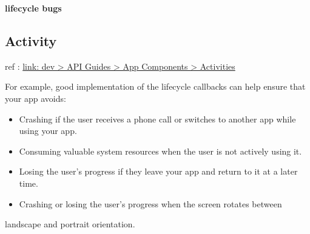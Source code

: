 \textbf{lifecycle bugs}

\subsection{Activity}
\label{sec:orgheadline8}
ref : \href{https://developer.android.com/guide/components/activities/activity-lifecycle.html}{link: dev > API Guides > App Components > Activities}

For example, good implementation of the lifecycle callbacks can help ensure
that your app avoids:
\begin{itemize}
\item Crashing if the user receives a phone call or switches to another app while
using your app.
\item Consuming valuable system resources when the user is not actively using it.
\item Losing the user's progress if they leave your app and return to it at a later
time.
\item Crashing or losing the user's progress when the screen rotates between
\end{itemize}
landscape and portrait orientation.



